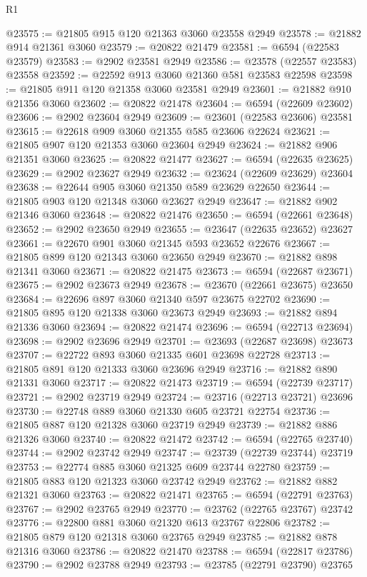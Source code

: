 \begin{lexlean}{R1}
\begin{coremodule}
@23575 := @21805 @915 @120 @21363 @3060 @23558 @2949
@23578 := @21882 @914 @21361 @3060
@23579 := @20822 @21479
@23581 := @6594 (@22583 @23579)
@23583 := @2902 @23581 @2949
@23586 := @23578 (@22557 @23583) @23558
@23592 := @22592 @913 @3060 @21360 @581 @23583 @22598
@23598 := @21805 @911 @120 @21358 @3060 @23581 @2949
@23601 := @21882 @910 @21356 @3060
@23602 := @20822 @21478
@23604 := @6594 (@22609 @23602)
@23606 := @2902 @23604 @2949
@23609 := @23601 (@22583 @23606) @23581
@23615 := @22618 @909 @3060 @21355 @585 @23606 @22624
@23621 := @21805 @907 @120 @21353 @3060 @23604 @2949
@23624 := @21882 @906 @21351 @3060
@23625 := @20822 @21477
@23627 := @6594 (@22635 @23625)
@23629 := @2902 @23627 @2949
@23632 := @23624 (@22609 @23629) @23604
@23638 := @22644 @905 @3060 @21350 @589 @23629 @22650
@23644 := @21805 @903 @120 @21348 @3060 @23627 @2949
@23647 := @21882 @902 @21346 @3060
@23648 := @20822 @21476
@23650 := @6594 (@22661 @23648)
@23652 := @2902 @23650 @2949
@23655 := @23647 (@22635 @23652) @23627
@23661 := @22670 @901 @3060 @21345 @593 @23652 @22676
@23667 := @21805 @899 @120 @21343 @3060 @23650 @2949
@23670 := @21882 @898 @21341 @3060
@23671 := @20822 @21475
@23673 := @6594 (@22687 @23671)
@23675 := @2902 @23673 @2949
@23678 := @23670 (@22661 @23675) @23650
@23684 := @22696 @897 @3060 @21340 @597 @23675 @22702
@23690 := @21805 @895 @120 @21338 @3060 @23673 @2949
@23693 := @21882 @894 @21336 @3060
@23694 := @20822 @21474
@23696 := @6594 (@22713 @23694)
@23698 := @2902 @23696 @2949
@23701 := @23693 (@22687 @23698) @23673
@23707 := @22722 @893 @3060 @21335 @601 @23698 @22728
@23713 := @21805 @891 @120 @21333 @3060 @23696 @2949
@23716 := @21882 @890 @21331 @3060
@23717 := @20822 @21473
@23719 := @6594 (@22739 @23717)
@23721 := @2902 @23719 @2949
@23724 := @23716 (@22713 @23721) @23696
@23730 := @22748 @889 @3060 @21330 @605 @23721 @22754
@23736 := @21805 @887 @120 @21328 @3060 @23719 @2949
@23739 := @21882 @886 @21326 @3060
@23740 := @20822 @21472
@23742 := @6594 (@22765 @23740)
@23744 := @2902 @23742 @2949
@23747 := @23739 (@22739 @23744) @23719
@23753 := @22774 @885 @3060 @21325 @609 @23744 @22780
@23759 := @21805 @883 @120 @21323 @3060 @23742 @2949
@23762 := @21882 @882 @21321 @3060
@23763 := @20822 @21471
@23765 := @6594 (@22791 @23763)
@23767 := @2902 @23765 @2949
@23770 := @23762 (@22765 @23767) @23742
@23776 := @22800 @881 @3060 @21320 @613 @23767 @22806
@23782 := @21805 @879 @120 @21318 @3060 @23765 @2949
@23785 := @21882 @878 @21316 @3060
@23786 := @20822 @21470
@23788 := @6594 (@22817 @23786)
@23790 := @2902 @23788 @2949
@23793 := @23785 (@22791 @23790) @23765

\end{coremodule}
\end{lexlean}
